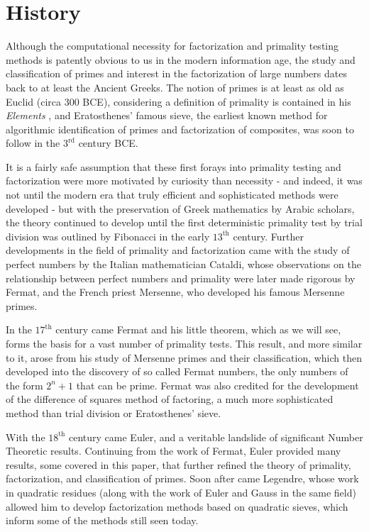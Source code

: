 \documentclass{article}
\begin{document}
\section*{History}\label{History}
  
\par Although the computational necessity for factorization and primality testing methods is patently obvious to us in the modern 
information age, the study and classification of primes and interest in the factorization of large numbers dates back to at least the Ancient Greeks. The notion of primes is at least as old as Euclid (circa 300 BCE), considering a definition of primality is contained in his \textit{ Elements} \citep{historyref}, and Eratosthenes' famous sieve, the earliest known method for algorithmic identification of primes and factorization of composites, was soon to follow in the $3^{\text{rd}}$ century BCE. 
\par It is a fairly safe assumption that these first forays into primality testing and factorization were more motivated by curiosity than necessity -  and indeed, it was not until the modern era that truly efficient and sophisticated methods were developed - but with the preservation of Greek mathematics by Arabic scholars, the theory continued to develop until the first deterministic primality test by trial division was outlined by Fibonacci in the early $13^{\text{th}}$ century. Further developments in the field of primality and factorization came with the study of perfect numbers by the Italian mathematician Cataldi, whose observations on the relationship between perfect numbers and primality were later made rigorous by Fermat, and the French priest Mersenne, who developed his famous Mersenne primes.
\par In the $17^{\text{th}}$ century came Fermat and his little theorem, which as we will see, forms the basis for a vast number of primality tests. This result, and more similar to it, arose from his study of Mersenne primes and their classification, which then developed into the discovery of so called Fermat numbers, the only numbers of the form $2^n + 1$ that can be prime. Fermat was also credited for the development of the difference of squares method of factoring, a much more sophisticated method than trial division or Eratosthenes' sieve.
\par With the $18^{\text{th}}$ century came Euler, and a veritable landslide of significant Number Theoretic results. Continuing from the work of Fermat, Euler provided many results, some covered in this paper, that further refined the theory of primality, factorization, and classification of primes. Soon after came Legendre, whose work in quadratic residues (along with the work of Euler and Gauss in the same field) allowed him to develop factorization methods based on quadratic sieves, which inform some of the methods still seen today.
\end{document}

